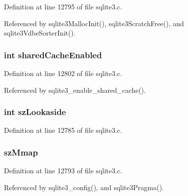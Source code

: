 Definition at line 12795 of file sqlite3.\+c.



Referenced by sqlite3\+Malloc\+Init(), sqlite3\+Scratch\+Free(), and sqlite3\+Vdbe\+Sorter\+Init().

\hypertarget{struct_sqlite3_config_a5c1b69700e52ef116cbc6fdde53ef47d}{}
\subsubsection[{shared\+Cache\+Enabled}]{\setlength{\rightskip}{0pt plus 5cm}int shared\+Cache\+Enabled}\label{struct_sqlite3_config_a5c1b69700e52ef116cbc6fdde53ef47d}


Definition at line 12802 of file sqlite3.\+c.



Referenced by sqlite3\+\_\+enable\+\_\+shared\+\_\+cache().

\hypertarget{struct_sqlite3_config_a60ef70cefa59c42de0133555420243a0}{}
\subsubsection[{sz\+Lookaside}]{\setlength{\rightskip}{0pt plus 5cm}int sz\+Lookaside}\label{struct_sqlite3_config_a60ef70cefa59c42de0133555420243a0}


Definition at line 12785 of file sqlite3.\+c.

\hypertarget{struct_sqlite3_config_a16be0b65471da845d6b829adf5f17957}{}
\subsubsection[{sz\+Mmap}]{ sz\+Mmap}\label{struct_sqlite3_config_a16be0b65471da845d6b829adf5f17957}


Definition at line 12793 of file sqlite3.\+c.



Referenced by sqlite3\+\_\+config(), and sqlite3\+Pragma().

\hypertarget{struct_sqlite3_config_a0ead96b04a1cc6dc6ec781782e82d052}{}
